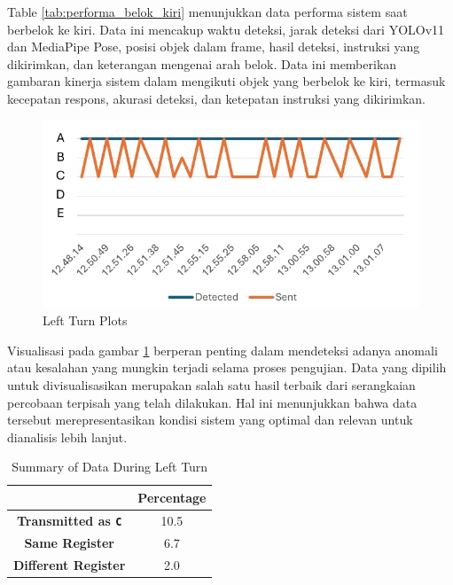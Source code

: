 Table \ref{tab:performa_belok_kiri} menunjukkan data performa sistem saat berbelok ke kiri. Data ini mencakup waktu deteksi, jarak deteksi dari YOLOv11 dan MediaPipe Pose, posisi objek dalam frame, hasil deteksi, instruksi yang dikirimkan, dan keterangan mengenai arah belok. Data ini memberikan gambaran kinerja sistem dalam mengikuti objek yang berbelok ke kiri, termasuk kecepatan respons, akurasi deteksi, dan ketepatan instruksi yang dikirimkan.

\begin{figure}[H]
    \centering
    \includegraphics[width=1\textwidth]{gambar/tex/left.pdf}
    \caption{Left Turn Plots}
    \label{fig:left_turn_plots}
\end{figure}

Visualisasi pada gambar \ref{fig:left_turn_plots} berperan penting dalam mendeteksi adanya anomali atau kesalahan yang mungkin terjadi selama proses pengujian. Data yang dipilih untuk divisualisasikan merupakan salah satu hasil terbaik dari serangkaian percobaan terpisah yang telah dilakukan. Hal ini menunjukkan bahwa data tersebut merepresentasikan kondisi sistem yang optimal dan relevan untuk dianalisis lebih lanjut.

\begin{table}[H]
    \centering
    \caption{Summary of Data During Left Turn}
    \label{tab:left_turn_data_transmission_detection}
    \begin{tabular}{|c|c|}
        \hline 
        \cellcolor[HTML]{000000} & \cellcolor[HTML]{C0C0C0} \textbf{Percentage}  \\ \hline
        \cellcolor[HTML]{C0C0C0} \textbf{Transmitted as \texttt{C}} & 10.5 \\ \hline
        \cellcolor[HTML]{C0C0C0} \textbf{Same Register}  & 6.7 \\ \hline
        \cellcolor[HTML]{C0C0C0} \textbf{Different Register}   & 2.0 \\ \hline
    \end{tabular}
\end{table}

